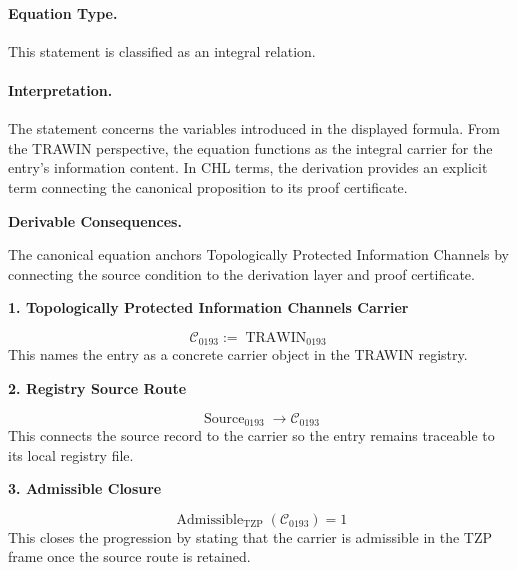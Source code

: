\paragraph{Equation Type.}
This statement is classified as an integral relation.

\paragraph{Interpretation.}
The statement concerns the variables introduced in the displayed formula. From the TRAWIN perspective, the equation functions as the integral carrier for the entry’s information content. In CHL terms, the derivation provides an explicit term connecting the canonical proposition to its proof certificate.

\par\vspace{0.35em}
\noindent\textbf{Derivable Consequences.}\quad
\begingroup
\footnotesize
\raggedright
The canonical equation anchors Topologically Protected Information Channels by connecting the source condition to the derivation layer and proof certificate.
\par\endgroup

\noindent\textbf{1. Topologically Protected Information Channels Carrier}\par
\[
\mathcal{C}_{0193} := \operatorname{TRAWIN}_{0193}
\]
\noindent This names the entry as a concrete carrier object in the TRAWIN registry.\par
\noindent\textbf{2. Registry Source Route}\par
\[
\operatorname{Source}_{0193}\longrightarrow \mathcal{C}_{0193}
\]
\noindent This connects the source record to the carrier so the entry remains traceable to its local registry file.\par
\noindent\textbf{3. Admissible Closure}\par
\[
\operatorname{Admissible}_{\mathrm{TZP}}\!\left(\mathcal{C}_{0193}\right)=1
\]
\noindent This closes the progression by stating that the carrier is admissible in the TZP frame once the source route is retained.\par

